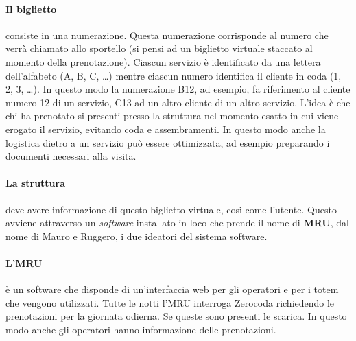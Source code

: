 \paragraph{Il biglietto} consiste in una numerazione. Questa numerazione corrisponde al numero che verrà chiamato allo sportello (si pensi ad un biglietto virtuale staccato al momento della prenotazione). Ciascun servizio è identificato da una lettera dell’alfabeto (A, B, C, \dots) mentre ciascun numero identifica il cliente in coda (1, 2, 3, \dots). In questo modo la numerazione B12, ad esempio, fa riferimento al cliente numero 12 di un servizio, C13 ad un altro cliente di un altro servizio. L’idea è che chi ha prenotato si presenti presso la struttura nel momento esatto in cui viene erogato il servizio, evitando coda e assembramenti. In questo modo anche la logistica dietro a un servizio può essere ottimizzata, ad esempio preparando i documenti necessari alla visita.
\paragraph{La struttura } deve avere informazione di questo biglietto virtuale, così come l’utente.  Questo avviene attraverso un \textsl{software} installato in loco che prende il nome di \textbf{MRU}, dal nome di Mauro e Ruggero, i due ideatori del sistema software.
\paragraph{L'MRU} è un software che disponde di un'interfaccia web per gli operatori e per i totem che vengono utilizzati. Tutte le notti l'MRU interroga Zerocoda richiedendo le prenotazioni per la giornata odierna. Se queste sono presenti le scarica. In questo modo anche gli operatori hanno informazione delle prenotazioni.

